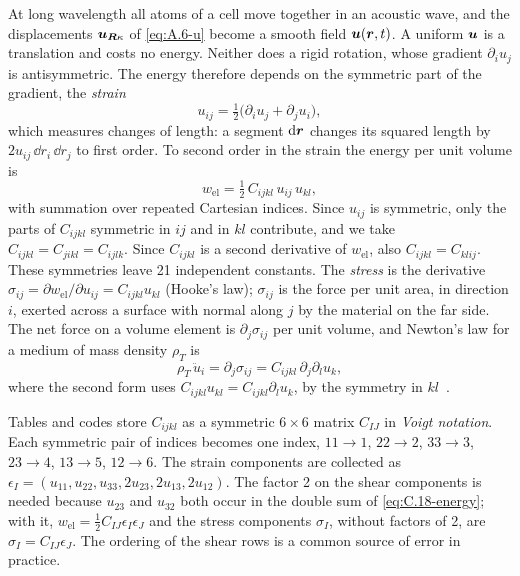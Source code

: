 At long wavelength all atoms of a cell move together in an acoustic wave, and the displacements $\bm{u}_{\bm{R}\kappa}$ of \cref{eq:A.6-u} become a smooth field $\bm{u}(\bm{r},t)$. A uniform $\bm{u}$ is a translation and costs no energy. Neither does a rigid rotation, whose gradient $\partial_iu_j$ is antisymmetric. The energy therefore depends on the symmetric part of the gradient, the \emph{strain}
\begin{equation}
  u_{ij} = \tfrac12\bigl(\partial_iu_j + \partial_ju_i\bigr) ,
  \label{eq:C.18-strain}
\end{equation}
which measures changes of length: a segment $\mathrm{d}\bm{r}$ changes its squared length by $2u_{ij}\,\dd r_i\,\dd r_j$ to first order. To second order in the strain the energy per unit volume is
\begin{equation}
  w_{\mathrm{el}} = \tfrac12\,C_{ijkl}\,u_{ij}\,u_{kl} ,
  \label{eq:C.18-energy}
\end{equation}
with summation over repeated Cartesian indices. Since $u_{ij}$ is symmetric, only the parts of $C_{ijkl}$ symmetric in $ij$ and in $kl$ contribute, and we take $C_{ijkl} = C_{jikl} = C_{ijlk}$. Since $C_{ijkl}$ is a second derivative of $w_{\mathrm{el}}$, also $C_{ijkl} = C_{klij}$. These symmetries leave 21 independent constants. The \emph{stress} is the derivative $\sigma_{ij} = \partial w_{\mathrm{el}}/\partial u_{ij} = C_{ijkl}u_{kl}$ (Hooke's law); $\sigma_{ij}$ is the force per unit area, in direction $i$, exerted across a surface with normal along $j$ by the material on the far side. The net force on a volume element is $\partial_j\sigma_{ij}$ per unit volume, and Newton's law for a medium of mass density $\rho_T$ is
\begin{equation}
  \rho_T\,\ddot u_i = \partial_j\sigma_{ij} = C_{ijkl}\,\partial_j\partial_l u_k ,
  \label{eq:C.18-eom}
\end{equation}
where the second form uses $C_{ijkl}u_{kl} = C_{ijkl}\partial_lu_k$, by the symmetry in $kl$~\cite{landau1986theory}.

Tables and codes store $C_{ijkl}$ as a symmetric $6\times6$ matrix $C_{IJ}$ in \emph{Voigt notation}. Each symmetric pair of indices becomes one index, $11 \to 1$, $22 \to 2$, $33 \to 3$, $23 \to 4$, $13 \to 5$, $12 \to 6$. The strain components are collected as $\epsilon_I = (u_{11}, u_{22}, u_{33}, 2u_{23}, 2u_{13}, 2u_{12})$. The factor 2 on the shear components is needed because $u_{23}$ and $u_{32}$ both occur in the double sum of \cref{eq:C.18-energy}; with it, $w_{\mathrm{el}} = \tfrac12 C_{IJ}\epsilon_I\epsilon_J$ and the stress components $\sigma_I$, without factors of 2, are $\sigma_I = C_{IJ}\epsilon_J$. The ordering of the shear rows is a common source of error in practice.

